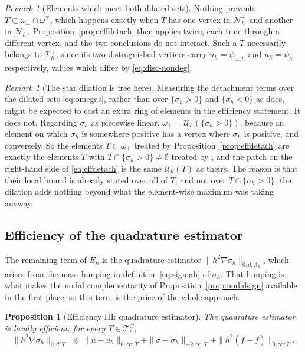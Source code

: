\documentclass[12pt]{amsart}
\numberwithin{equation}{section}
\theoremstyle{plain}
\newtheorem{proposition}[theorem]{Proposition}
\theoremstyle{definition}
\theoremstyle{remark}
\newtheorem{remark}[theorem]{Remark}
\newcommand{\psiloh}{\psi_{\bot,h}}
\newcommand{\psiuph}{\psi^\top_h}
\newcommand{\Th}{\mathcal{T}_h}
\newcommand{\Nh}{\mathcal{N}_h}
\newcommand{\Uh}{\mathcal{U}_h}
\newcommand{\Thplus}{\Th^+}
\newcommand{\ThC}{\Th^C}
\newcommand{\Lamh}{\Lambda_h}
\newcommand{\ombot}{\omega_\bot}
\newcommand{\omtop}{\omega^\top}
\begin{document}
\begin{remark}[Elements which meet both dilated sets]
\label{rem:bothsides}
Nothing prevents $T \subset \ombot \cap \omtop$, which happens exactly when $T$ has one vertex in $\Nh^+$ and another in $\Nh^-$.  Proposition~\ref{prop:effdetach} then applies twice, each time through a different vertex, and the two conclusions do not interact.  Such a $T$ necessarily belongs to $\Thplus$, since its two distinguished vertices carry $u_h = \psiloh$ and $u_h = \psiuph$ respectively, values which differ by \eqref{eq:disc-nondeg}.
\end{remark}

\begin{remark}[The star dilation is free here]
\label{rem:noextraring}
Measuring the detachment terms over the dilated sets \eqref{eq:omegas}, rather than over $\{\sigma_h>0\}$ and $\{\sigma_h<0\}$ as \cite{NSV03} does, might be expected to cost an extra ring of elements in the efficiency statement.  It does not.  Regarding $\sigma_h$ as piecewise linear, $\ombot = \Uh(\{\sigma_h>0\})$, because an element on which $\sigma_h$ is somewhere positive has a vertex where $\sigma_h$ is positive, and conversely.  So the elements $T \subset \ombot$ treated by Proposition~\ref{prop:effdetach} are exactly the elements $T$ with $T \cap \{\sigma_h > 0\} \ne \emptyset$ treated by \cite[Proposition 6.3]{NSV03}, and the patch on the right-hand side of \eqref{eq:effdetach} is the same $\Uh(T)$ as theirs.  The reason is that their local bound is already stated over all of $T$, and not over $T \cap \{\sigma_h>0\}$; the dilation adds nothing beyond what the element-wise maximum was taking anyway.
\end{remark}

\subsection{Efficiency of the quadrature estimator}  The remaining term of $E_h$ is the quadrature estimator $\|h^2\nabla\sigma_h\|_{0,d;\Lamh}$, which arises from the mass lumping in definition \eqref{eq:sigmah} of $\sigma_h$.  That lumping is what makes the nodal complementarity of Proposition~\ref{prop:nodalsign} available in the first place, so this term is the price of the whole approach.

\begin{proposition}[Efficiency III: quadrature estimator]
\label{prop:effquad}
The quadrature estimator is locally efficient: for every $T \in \ThC$,
\begin{equation}
\label{eq:effquad}
  \|h^2\nabla\sigma_h\|_{0,d;T} \ \preceq\ \|u-u_h\|_{0,\infty;T} + \|\sigma-\tilde\sigma_h\|_{-2,\infty;T} + \|h^2(f-\bar f)\|_{0,\infty;T}.
\end{equation}
\end{proposition}
\end{document}
